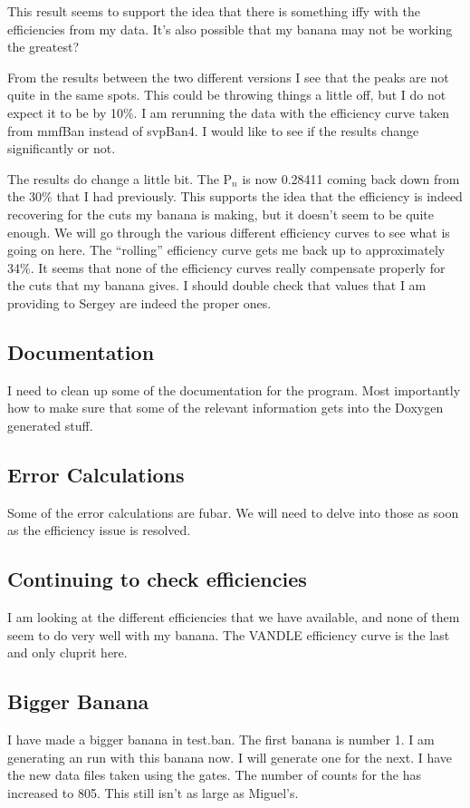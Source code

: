This result seems to support the idea that there is something iffy with the 
efficiencies from my data. It's also possible that my banana may not be 
working the greatest? 

From the results between the two different versions I see that the peaks 
are not quite in the same spots. This could be throwing things a little 
off, but I do not expect it to be by 10\%. I am rerunning the data with 
the efficiency curve taken from mmfBan instead of svpBan4. I would like to 
see if the results change significantly or not. 

The results do change a little bit. The P$_n$ is now 0.28411 coming back down 
from the 30\% that I had previously. This supports the idea that the efficiency
is indeed recovering for the cuts my banana is making, but it doesn't seem to 
be quite enough. We will go through the various different efficiency curves to 
see what is going on here. The ``rolling'' efficiency curve gets me back up to 
approximately 34\%. It seems that none of the efficiency curves really 
compensate properly for the cuts that my banana gives. I should double check 
that values that I am providing to Sergey are indeed the proper ones. 

\subsection{Documentation}
I need to clean up some of the documentation for the program. Most importantly 
how to make sure that some of the relevant information gets into the Doxygen 
generated stuff. 

\subsection{Error Calculations}
Some of the error calculations are fubar. We will need to delve into those as 
soon as the efficiency issue is resolved. 

\subsection{Continuing to check efficiencies}
I am looking at the different efficiencies that we have available, and none of 
them seem to do very well with my banana. The VANDLE efficiency curve is the 
last and only cluprit here. 

\subsection{Bigger Banana}
I have made a bigger banana in test.ban. The first banana is number 1. I am 
generating an  run with this banana now. I will generate one for 
the  next. I have the new data files taken using the gates. The 
number of counts for the  has increased to 805. This still isn't 
as large as Miguel's.

